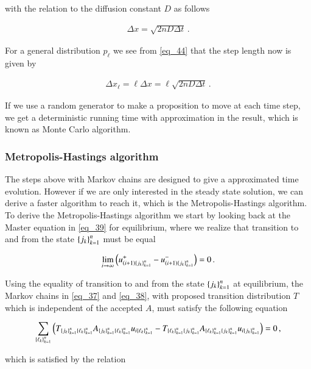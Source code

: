\documentclass[11pt,english,a4paper]{article}
\begin{document}
\begin{flushleft}
with the relation to the diffusion constant $D$ as follows

\begin{align}
\Delta x = \sqrt{2nD\Delta t}\,. 
\label{eq_45}
\end{align}

For a general distribution $p_\ell$ we see from \eqref{eq_44} that the step length now is given by

\begin{align}
\Delta x_\ell = \ell \Delta x = \ell\sqrt{2nD\Delta t}\,.
\label{eq_46}
\end{align} 

If we use a random generator to make a proposition to move at each time step, we get a deterministic running time with approximation in the result, which is known as Monte Carlo algorithm. 

\subsubsection{Metropolis-Hastings algorithm}

The steps above with Markov chains are designed to give a approximated time evolution. However if we are only interested in the steady state solution, we can derive a faster algorithm to reach it, which is the Metropolis-Hastings algorithm. To derive the Metropolis-Hastings algorithm we start by looking back at the Master equation in \eqref{eq_39} for equilibrium, where we realize that transition to and from the state $\left\lbrace{j_k}\right\rbrace_{k=1}^n$ must be equal

\begin{align*}
\lim_{i\to \infty} \left({u_{(i+1)\left\lbrace{j_k}\right\rbrace_{k=1}^n}^+ - u_{(i+1)\left\lbrace{j_k}\right\rbrace_{k=1}^n}^-}\right) = 0 \,.
\end{align*}

Using the equality of transition to and from the state $\left\lbrace{j_k}\right\rbrace_{k=1}^n$ at equilibrium,  the Markov chains in \eqref{eq_37} and \eqref{eq_38}, with proposed transition distribution $T$ which is independent of the accepted $A$, must satisfy the following equation

\begin{align*}
\sum_{\left\lbrace{\ell_k}\right\rbrace_{k=1}^n}\left({T_{\left\lbrace{j_k}\right\rbrace_{k=1}^n \left\lbrace{\ell_k}\right\rbrace_{k=1}^n}A_{\left\lbrace{j_k}\right\rbrace_{k=1}^n \left\lbrace{\ell_k}\right\rbrace_{k=1}^n} u_{i\left\lbrace{\ell_k}\right\rbrace_{k=1}^n} - T_{\left\lbrace{\ell_k}\right\rbrace_{k=1}^n \left\lbrace{j_k}\right\rbrace_{k=1}^n}A_{\left\lbrace{\ell_k}\right\rbrace_{k=1}^n \left\lbrace{j_k}\right\rbrace_{k=1}^n} u_{i\left\lbrace{j_k}\right\rbrace_{k=1}^n}}\right) = 0 \,,
\end{align*}


which is satisfied by the relation


\end{flushleft}
\end{document}
